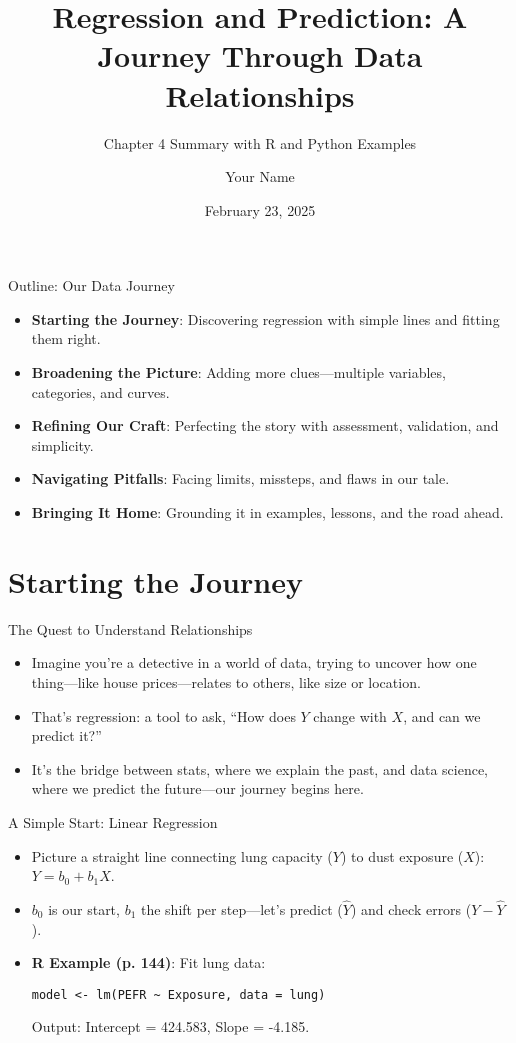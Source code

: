 \documentclass{beamer}
\title{Regression and Prediction: A Journey Through Data Relationships}
\subtitle{Chapter 4 Summary with R and Python Examples}
\author{Your Name}
\date{February 23, 2025}
\begin{document}
\begin{frame}
  \titlepage
\end{frame}

\begin{frame}{Outline: Our Data Journey}
  \begin{itemize}
    \item \textbf{Starting the Journey}: Discovering regression with simple lines and fitting them right.
    \item \textbf{Broadening the Picture}: Adding more clues—multiple variables, categories, and curves.
    \item \textbf{Refining Our Craft}: Perfecting the story with assessment, validation, and simplicity.
    \item \textbf{Navigating Pitfalls}: Facing limits, missteps, and flaws in our tale.
    \item \textbf{Bringing It Home}: Grounding it in examples, lessons, and the road ahead.
  \end{itemize}
\end{frame}

\section{Starting the Journey}

\begin{frame}{The Quest to Understand Relationships}
  \begin{itemize}
    \item Imagine you’re a detective in a world of data, trying to uncover how one thing—like house prices—relates to others, like size or location.
    \item That’s regression: a tool to ask, ``How does $Y$ change with $X$, and can we predict it?''
    \item It’s the bridge between stats, where we explain the past, and data science, where we predict the future—our journey begins here.
  \end{itemize}
\end{frame}

\begin{frame}[fragile]{A Simple Start: Linear Regression}
  \begin{itemize}
    \item Picture a straight line connecting lung capacity ($Y$) to dust exposure ($X$): $Y = b_0 + b_1X$.
    \item $b_0$ is our start, $b_1$ the shift per step—let’s predict ($\hat{Y}$) and check errors ($Y - \hat{Y}$).
    \item \textbf{R Example (p. 144)}: Fit lung data:
      \begin{lstlisting}
model <- lm(PEFR ~ Exposure, data = lung)
      \end{lstlisting}
      Output: Intercept = 424.583, Slope = -4.185.
  \end{itemize}
\end{frame}
\end{document}
